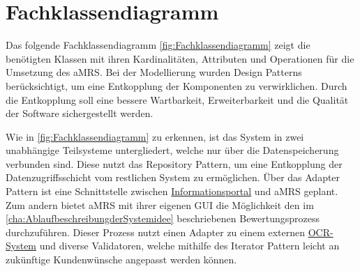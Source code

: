 \section{Fachklassendiagramm}

\noindent Das folgende Fachklassendiagramm \autoref{fig:Fachklassendiagramm} zeigt die benötigten Klassen mit ihren
Kardinalitäten, Attributen und Operationen für die Umsetzung des \ac{aMRS}. Bei der Modellierung wurden Design Patterns
berücksichtigt, um eine Entkopplung der Komponenten zu verwirklichen. Durch die Entkopplung soll eine bessere
Wartbarkeit, Erweiterbarkeit und die Qualität der Software sichergestellt werden. \newline

\noindent Wie in \autoref{fig:Fachklassendiagramm} zu erkennen, ist das System in zwei unabhängige Teilsysteme
untergliedert, welche nur über die Datenspeicherung verbunden sind. Diese nutzt das Repository Pattern, um eine
Entkopplung der Datenzugriffsschicht vom restlichen System zu ermöglichen. Über das Adapter Pattern ist eine
Schnittstelle zwischen \hyperref[gls:informationsportal]{Informationsportal} und \ac{aMRS} geplant. Zum andern bietet \ac{aMRS} mit ihrer eigenen GUI die
Möglichkeit den im \autoref{cha:AblaufbeschreibungderSystemidee} beschriebenen Bewertungsprozess durchzuführen. Dieser Prozess nutzt einen Adapter
zu einem externen \hyperref[gls:ocr-System]{OCR-System} und diverse Validatoren, welche mithilfe des Iterator Pattern leicht an zukünftige
Kundenwünsche angepasst werden können.

\newpage

